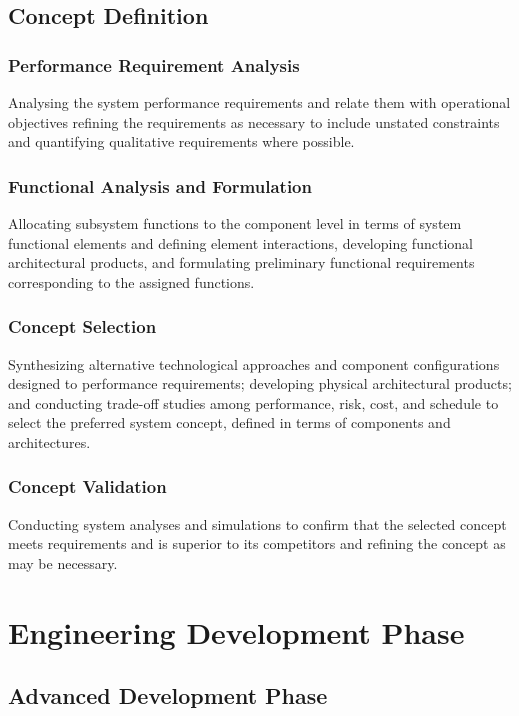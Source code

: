 \documentclass[a4paper,11pt,fleqn]{report}
\begin{document}
\section{Concept Definition}
\subsection{Performance Requirement Analysis}
Analysing the system performance requirements and relate them with operational objectives refining the requirements as necessary to include unstated constraints and quantifying qualitative requirements where possible. 

\subsection{Functional Analysis and Formulation} 
Allocating subsystem functions to the component level in terms of system functional elements and defining element interactions, developing functional architectural products, and formulating preliminary functional requirements corresponding to the assigned functions. 

\subsection{Concept Selection}
Synthesizing alternative technological approaches and component configurations designed to performance requirements; developing physical architectural products; and conducting trade-off studies among performance, risk, cost, and schedule to select the preferred system concept, defined in terms of components and architectures. 

\subsection{Concept Validation}
Conducting system analyses and simulations to confirm that the selected concept meets requirements and is superior to its competitors and refining the concept as may be necessary. 

\chapter{Engineering Development Phase}

\section{Advanced Development Phase}
\end{document}
